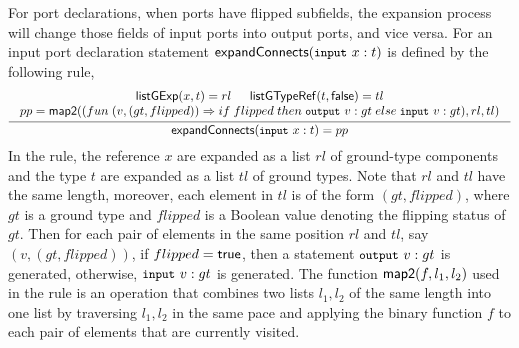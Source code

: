 For port declarations, 
when ports have flipped subfields, the expansion process will
change those fields of input ports into output ports, and vice
versa. %
For an input port declaration statement $\expandconnects(\mbox{\prettyll{input} }x: t)$ is defined by the following rule, 
 \begin{gather*}
   \label{expand-input}
   \infer[]
         {\seqq{\expandconnects(\mbox{\prettyll{input} }x: t) = pp}}
         {\begin{array}{c}
             {\listgexp(x, t)} = rl \hspace{15pt} \listgtyperef(t, \lfalse) = tl \\
             pp= \fmaptwo((fun\; (v, (gt, flipped)) \Rightarrow if\; flipped \;then\; \mbox{\prettyll{output}}\ v: gt  \;else\; \mbox{\prettyll{input} }v: gt), rl, tl)
           \end{array}
         }
 \end{gather*}
In the rule, the reference $x$ are expanded as a list $rl$ of ground-type components and the type $t$ are expanded as a list $tl$ of ground types.  Note that $rl$ and $tl$ have the same length, moreover, each element in $tl$ is of the form $(gt, flipped)$, where $gt$ is a ground type and $flipped$ is a Boolean value denoting the flipping status of $gt$. Then for each pair of elements in the same position $rl$ and $tl$, say $(v, (gt, flipped))$, if $flipped = {\sf true}$, then a statement $\mbox{\prettyll{output}}\ v: gt$ is generated, otherwise, $\mbox{\prettyll{input} }v: gt$ is generated. The function ${\sf map2}(f, l_1, l_2)$ used in the rule 
is an operation that combines two lists $l_1, l_2$ of the same length into one list by traversing $l_1, l_2$ in the same pace and applying the binary function $f$ to each pair of elements that are currently visited. 

